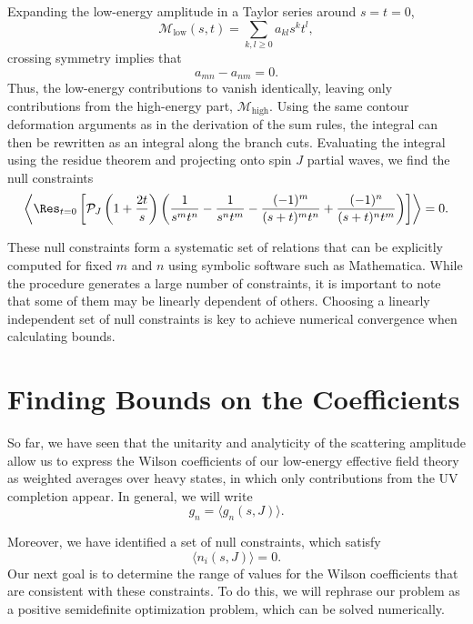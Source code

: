 Expanding the low-energy amplitude in a Taylor series around $s=t=0$,
\begin{equation}
\mathcal{M}_\text{low}(s,t) = \sum_{k,l \ge 0} a_{kl} s^k t^l,
\end{equation}
crossing symmetry implies that
\begin{equation}
a_{mn} - a_{nm} = 0.
\end{equation}
Thus, the low-energy contributions to  vanish identically, leaving only contributions from the high-energy part, $\mathcal{M}_{\text{high}}$.
Using the same contour deformation arguments as in the derivation of the sum rules, the integral can then be rewritten as an integral along the branch cuts.
Evaluating the integral using the residue theorem and projecting onto spin $J$ partial waves, we find the null constraints \autocite{Albert:2023jtd}
\begin{equation}
\left\langle \Res_{t=0} \left[ \mathcal{P}_J \left( 1+ \frac{2t}{s} \right)
\left( \frac{1}{s^m t^n } - \frac{1}{ s^n t^m} - \frac{(-1)^m}{(s+t)^m t^n} + \frac{(-1)^n}{(s+t)^n t^m} \right) \right] \right\rangle = 0.
\end{equation}

These null constraints form a systematic set of relations that can be explicitly computed for fixed $m$ and $n$ using symbolic software such as Mathematica. While the procedure generates a large number of constraints, it is important to note that some of them may be linearly dependent of others. Choosing a linearly independent set of null constraints is key to achieve numerical convergence when calculating bounds.

\section{Finding Bounds on the Coefficients}
So far, we have seen that the unitarity and analyticity of the scattering amplitude allow us to express the Wilson coefficients of our low-energy effective field theory as weighted averages over heavy states, in which only contributions from the UV completion appear. In general, we will write 
\begin{equation}
    g_n = \langle g_n(s, J) \rangle.
\end{equation}

Moreover, we have identified a set of null constraints, which satisfy
\begin{equation}
\langle n_i(s, J) \rangle = 0.
\end{equation}
Our next goal is to determine the range of values for the Wilson coefficients that are consistent with these constraints. To do this, we will rephrase our problem as a positive semidefinite optimization problem, which can be solved numerically.

